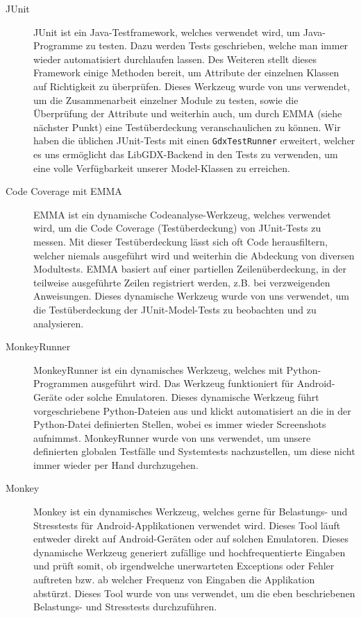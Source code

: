 \begin{description} 
\item[JUnit] JUnit ist ein Java-Testframework, welches verwendet wird, um Java-Programme zu testen. Dazu werden Tests geschrieben, welche man immer wieder automatisiert durchlaufen lassen.
	Des Weiteren stellt dieses Framework einige Methoden bereit, um Attribute der einzelnen Klassen auf Richtigkeit zu überprüfen.
	Dieses Werkzeug wurde von uns verwendet, um die Zusammenarbeit einzelner Module zu testen, sowie die Überprüfung der Attribute und weiterhin auch, um durch EMMA (siehe nächster Punkt) eine Testüberdeckung veranschaulichen zu können. Wir haben die üblichen JUnit-Tests mit einen \texttt{GdxTestRunner} erweitert, welcher es uns ermöglicht das LibGDX-Backend in den Tests zu verwenden, um eine volle Verfügbarkeit unserer Model-Klassen zu erreichen.


\item[Code Coverage mit EMMA] EMMA ist ein dynamische Codeanalyse-Werkzeug, welches verwendet wird, um die Code Coverage (Testüberdeckung) von JUnit-Tests zu messen.
	Mit dieser Testüberdeckung lässt sich oft  Code herausfiltern, welcher niemals ausgeführt wird und weiterhin die Abdeckung von diversen Modultests.
	EMMA basiert auf einer partiellen Zeilenüberdeckung, in der teilweise ausgeführte Zeilen registriert werden, z.B. bei verzweigenden Anweisungen.
	Dieses dynamische Werkzeug wurde von uns verwendet, um die Testüberdeckung der JUnit-Model-Tests zu beobachten und zu analysieren. 

\item[MonkeyRunner] MonkeyRunner ist ein dynamisches Werkzeug, welches mit Python-Programmen ausgeführt wird. Das Werkzeug funktioniert für Android-Geräte oder solche Emulatoren.
	Dieses dynamische Werkzeug führt vorgeschriebene Python-Dateien aus und klickt automatisiert an die in der Python-Datei definierten Stellen, wobei es immer wieder Screenshots aufnimmst.
	MonkeyRunner wurde von uns verwendet, um unsere definierten globalen Testfälle und Systemtests nachzustellen, um diese nicht immer wieder per Hand durchzugehen.


\item[Monkey] Monkey ist ein dynamisches Werkzeug, welches gerne für Belastungs- und Stresstests für Android-Applikationen verwendet wird. Dieses Tool läuft entweder direkt auf Android-Geräten oder auf solchen Emulatoren.
	Dieses dynamische Werkzeug generiert zufällige und hochfrequentierte Eingaben und prüft somit, ob irgendwelche unerwarteten Exceptions oder Fehler auftreten bzw. ab welcher Frequenz von Eingaben die Applikation 	  abstürzt. Dieses Tool wurde von uns verwendet, um die eben beschriebenen Belastungs- und Stresstests durchzuführen.
\end{description}
